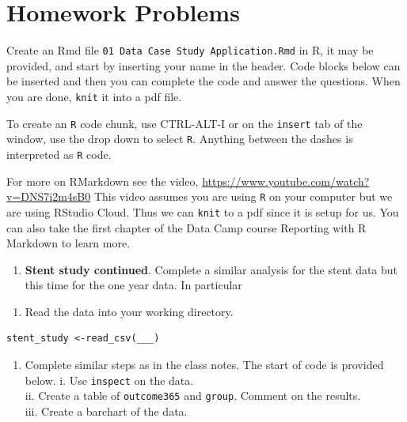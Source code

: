 \documentclass[
]{book}
\providecommand{\tightlist}{%
  \setlength{\itemsep}{0pt}\setlength{\parskip}{0pt}}
\begin{document}
\hypertarget{homework-problems}{%
\section{Homework Problems}\label{homework-problems}}

Create an Rmd file \texttt{01\ Data\ Case\ Study\ Application.Rmd} in R, it may be provided, and start by inserting your name in the header. Code blocks below can be inserted and then you can complete the code and answer the questions. When you are done, \texttt{knit} it into a pdf file.

To create an \texttt{R} code chunk, use CTRL-ALT-I or on the \texttt{insert} tab of the window, use the drop down to select \texttt{R}. Anything between the dashes is interpreted as \texttt{R} code.

For more on RMarkdown see the video, \url{https://www.youtube.com/watch?v=DNS7i2m4sB0} This video assumes you are using \texttt{R} on your computer but we are using RStudio Cloud. Thus we can \texttt{knit} to a pdf since it is setup for us. You can also take the first chapter of the Data Camp course Reporting with R Markdown to learn more.

\begin{enumerate}
\def\labelenumi{\arabic{enumi}.}
\tightlist
\item
  \textbf{Stent study continued}. Complete a similar analysis for the stent data but this time for the one year data. In particular
\end{enumerate}

\begin{enumerate}
\def\labelenumi{\alph{enumi}.}
\tightlist
\item
  Read the data into your working directory.
\end{enumerate}

\begin{verbatim}
stent_study <-read_csv(___)
\end{verbatim}

\begin{enumerate}
\def\labelenumi{\alph{enumi}.}
\setcounter{enumi}{1}
\tightlist
\item
  Complete similar steps as in the class notes. The start of code is provided below.
  i. Use \texttt{inspect} on the data.\\
  ii. Create a table of \texttt{outcome365} and \texttt{group}. Comment on the results.\\
  iii. Create a barchart of the data.
\end{enumerate}
\end{document}
